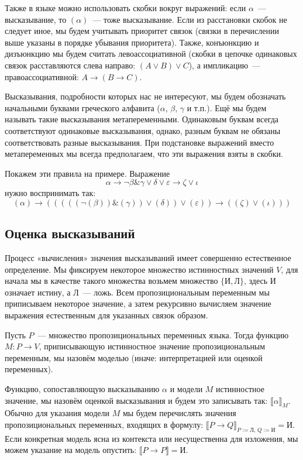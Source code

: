 \documentclass[a4paper,11pt]{article}
\theoremstyle{definition}
\newcommand{\sem}[2]{\llbracket #1 \rrbracket_{#2}}
\newcommand{\True}{\text{И}}
\newcommand{\False}{\text{Л}}
\begin{document}
Также в языке можно использовать скобки вокруг выражений: если $\alpha$~---
высказывание, то $(\alpha)$~--- тоже высказывание. Если из расстановки скобок не
следует иное, мы будем учитывать приоритет связок (связки в перечислении выше
указаны в порядке убывания приоритета). Также, конъюнкцию и дизъюнкцию мы будем
считать левоассоциативной (скобки в цепочке одинаковых связок расставляются
слева направо: $(A\vee B)\vee C$), а импликацию~--- правоассоциативной:
$A\to(B\to C)$.

Высказывания, подробности которых нас не интересуют, мы будем обозначать
начальными буквами греческого алфавита ($\alpha$, $\beta$, $\gamma$ и т.п.). Ещё
мы будем называть такие высказывания метапеременными. Одинаковым буквам всегда
соответствуют одинаковые высказывания, однако, разным буквам не обязаны
соответствовать разные высказывания. При подстановке выражений вместо
метапеременных мы всегда предполагаем, что эти выражения взяты в скобки.

Покажем эти правила на примере. Выражение
\[ \alpha \to \neg\beta\mathbin{\&}\gamma \vee \delta \vee \varepsilon \to \zeta \vee \iota \]
нужно воспринимать так:
\[ (\alpha) \to (((((\neg(\beta))\mathbin{\&}(\gamma)) \vee (\delta)) \vee (\varepsilon)) \to ((\zeta) \vee (\iota))) \]

\subsection{Оценка высказываний}
Процесс «вычисления» значения высказываний имеет совершенно естественное
определение. Мы фиксируем некоторое множество истинностных значений $V$, для
начала мы в качестве такого множества возьмем множество $\{\True, \False\}$,
здесь $\True$ означает истину, а $\False$~--- ложь. Всем пропозициональным
переменным мы приписываем некоторое значение, а затем рекурсивно вычисляем
значение выражения естественным для указанных связок образом.

Пусть $P$~--- множество пропозициональных переменных языка. Тогда функцию
$M : P \to V$, приписывающую истинностное значение пропозициональным
переменным, мы назовём моделью (иначе: интерпретацией или оценкой переменных).

Функцию, сопоставляющую высказыванию $\alpha$ и модели $M$ истинностное
значение, мы назовём оценкой высказывания и будем это записывать так:
$\sem{\alpha}{M}$. Обычно для указания модели $M$ мы будем перечислять значения
пропозициональных переменных, входящих в формулу:
$\sem{P \to Q}{P:=\False,\,Q:=\True} = \True$. Если конкретная модель ясна из
контекста или несущественна для изложения, мы можем указание на модель
опустить: $\llbracket P \to P \rrbracket = \True$.
\end{document}
